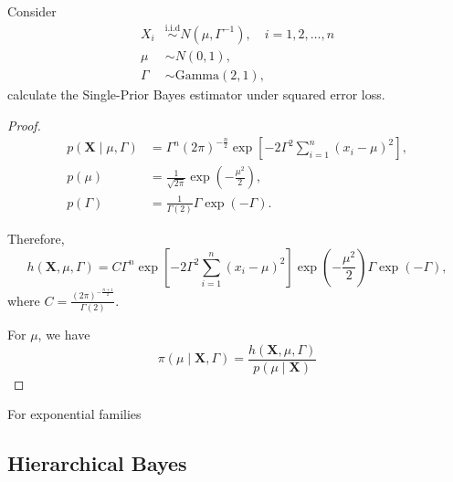 \begin{example}
	Consider
	\begin{equation*}
		\begin{aligned}
			X_i    & \stackrel{\text{i.i.d}}{\sim}N(\mu,\Gamma^{-1}),\quad i=1,2,\ldots,n \\
			\mu    & \sim N(0,1),                                                         \\
			\Gamma & \sim\text{Gamma}(2,1),
		\end{aligned}
	\end{equation*}
	calculate the Single-Prior Bayes estimator under squared error loss.
\end{example}

\begin{proof}
	\begin{equation*}
		\begin{aligned}
			p\left(\textbf{X}\mid\mu,\Gamma\right) & =\Gamma^n(2\pi)^{-\frac{n}{2}}\exp\left[-2\Gamma^2\sum_{i=1}^{n}(x_i-\mu)^2\right], \\
			p(\mu)                                 & =\frac{1}{\sqrt{2\pi}}\exp\left(-\frac{\mu^2}{2}\right),                            \\
			p(\Gamma)                              & =\frac{1}{\Gamma(2)}\Gamma\exp\left(-\Gamma\right).
		\end{aligned}
	\end{equation*}

	Therefore,
	\begin{equation*}
		h\left(\textbf{X},\mu,\Gamma\right)=C\Gamma^n\exp\left[-2\Gamma^2\sum_{i=1}^{n}(x_i-\mu)^2\right]\exp\left(-\frac{\mu^2}{2}\right)\Gamma\exp\left(-\Gamma\right),
	\end{equation*}
	where $C=\frac{(2\pi)^{-\frac{n+1}{2}}}{\Gamma(2)}$.

	For $\mu$, we have
	\begin{equation*}
		\pi\left(\mu\mid\textbf{X},\Gamma\right)=\frac{h\left(\textbf{X},\mu,\Gamma\right)}{p(\mu\mid\textbf{X})}
	\end{equation*}
\end{proof}

For exponential families

\begin{theorem}

\end{theorem}

\subsection{Hierarchical Bayes}

